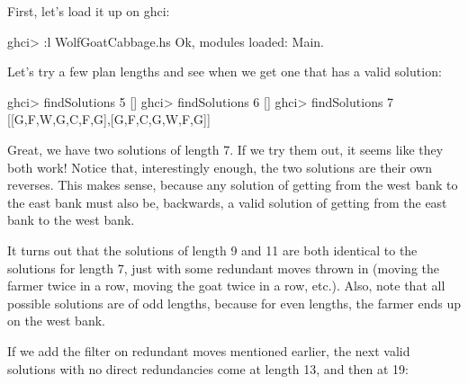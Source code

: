 \documentclass[]{article}
\newenvironment{Shaded}{}{}
\newcommand{\DataTypeTok}[1]{\textcolor[rgb]{0.56,0.13,0.00}{{#1}}}
\newcommand{\DecValTok}[1]{\textcolor[rgb]{0.25,0.63,0.44}{{#1}}}
\newcommand{\FunctionTok}[1]{\textcolor[rgb]{0.02,0.16,0.49}{{#1}}}
\newcommand{\NormalTok}[1]{{#1}}
\begin{document}
First, let's load it up on ghci:

\begin{Shaded}
\begin{Highlighting}[]
\NormalTok{ghci}\FunctionTok{>} \FunctionTok{:}\NormalTok{l WolfGoatCabbage.hs}
\DataTypeTok{Ok}\NormalTok{, modules loaded}\FunctionTok{:} \DataTypeTok{Main}\FunctionTok{.}
\end{Highlighting}
\end{Shaded}

Let's try a few plan lengths and see when we get one that has a valid solution:

\begin{Shaded}
\begin{Highlighting}[]
\NormalTok{ghci}\FunctionTok{>} \NormalTok{findSolutions }\DecValTok{5}
\NormalTok{[]}
\NormalTok{ghci}\FunctionTok{>} \NormalTok{findSolutions }\DecValTok{6}
\NormalTok{[]}
\NormalTok{ghci}\FunctionTok{>} \NormalTok{findSolutions }\DecValTok{7}
\NormalTok{[[}\DataTypeTok{G}\NormalTok{,}\DataTypeTok{F}\NormalTok{,}\DataTypeTok{W}\NormalTok{,}\DataTypeTok{G}\NormalTok{,}\DataTypeTok{C}\NormalTok{,}\DataTypeTok{F}\NormalTok{,}\DataTypeTok{G}\NormalTok{],[}\DataTypeTok{G}\NormalTok{,}\DataTypeTok{F}\NormalTok{,}\DataTypeTok{C}\NormalTok{,}\DataTypeTok{G}\NormalTok{,}\DataTypeTok{W}\NormalTok{,}\DataTypeTok{F}\NormalTok{,}\DataTypeTok{G}\NormalTok{]]}
\end{Highlighting}
\end{Shaded}

Great, we have two solutions of length 7. If we try them out, it seems like they
both work! Notice that, interestingly enough, the two solutions are their own
reverses. This makes sense, because any solution of getting from the west bank
to the east bank must also be, backwards, a valid solution of getting from the
east bank to the west bank.

It turns out that the solutions of length 9 and 11 are both identical to the
solutions for length 7, just with some redundant moves thrown in (moving the
farmer twice in a row, moving the goat twice in a row, etc.). Also, note that
all possible solutions are of odd lengths, because for even lengths, the farmer
ends up on the west bank.

If we add the filter on redundant moves mentioned earlier, the next valid
solutions with no direct redundancies come at length 13, and then at 19:
\end{document}
